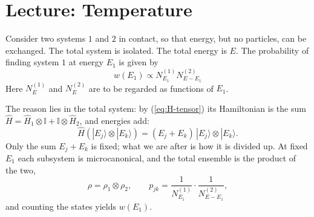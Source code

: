 
\section{Lecture: Temperature}
Consider two systems $1$ and $2$ in contact, so that energy, but no particles, can be exchanged. The total system is isolated. The total energy is $E$. The probability of finding system $1$ at energy $E_1$ is given by
\begin{equation}\label{eq:probenergy}
	w(E_1) \propto N_{E_1}^{(1)}N_{E-E_1}^{(2)}
\end{equation}
Here $N_{E}^{(1)}$ and $N_{E}^{(2)}$ are to be regarded as functions of $E_1$. 

The reason lies in the total system: by (\ref{eq:H-tensor}) its Hamiltonian is the sum $\widehat{H} = \widehat{H}_1\otimes \mathbb{I} + \mathbb{I}\otimes \widehat{H}_2$, and energies add:
\begin{equation}
	\widehat{H}\left(|E_j\rangle\otimes |E_k\rangle\right) = (E_j+E_k)\,|E_j\rangle\otimes |E_k\rangle.
\end{equation}
Only the sum $E_j+E_k$ is fixed; what we are after is how it is divided up. At fixed $E_1$ each subsystem is microcanonical, and the total ensemble is the product of the two,
\begin{equation}
	\rho = \rho_1\otimes \rho_2, \qquad p_{jk} = \frac{1}{N_{E_1}^{(1)}}\cdot\frac{1}{N_{E-E_1}^{(2)}},
\end{equation}
and counting the states yields $w(E_1)$.

